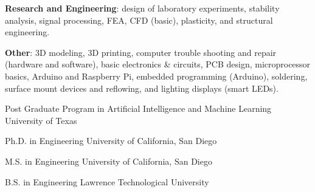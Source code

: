 \documentclass{leresume}
\begin{document}
\begin{bulletedlist}
		\item \textbf{Research and Engineering}: design of laboratory experiments,
                        stability analysis,
                        signal processing,
                        FEA,
                        CFD (basic),
                        plasticity,
                        and structural engineering.
                        
		\item \textbf{Other}: 3D modeling,
                        3D printing,
                        computer trouble shooting and repair (hardware and software),
                        basic electronics \& circuits,
                        PCB design,
                        microprocessor basics,
                        Arduino and Raspberry Pi,
                        embedded programming (Arduino),
                        soldering,
                        surface mount devices and reflowing,
                        and lighting displays (smart LEDs).
                        
	\end{bulletedlist}

	
                {Post Graduate Program in Artificial Intelligence and Machine Learning}
                {University of Texas}
		
                {Ph.D. in Engineering}
                {University of California, San Diego}
		
                {M.S. in Engineering}
                {University of California, San Diego}
		
                {B.S. in Engineering}
                {Lawrence Technological University}
		

    
\end{document}
